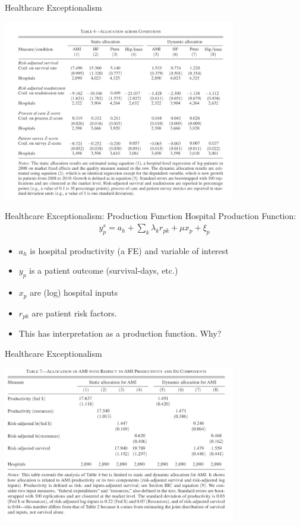 \documentclass[xcolor=pdftex,dvipsnames,table,mathserif,aspectratio=169]{beamer}
\begin{document}
\begin{frame}{Healthcare Exceptionalism}
\begin{center}
\includegraphics[width=4in]{./resources/hc4.png}
\end{center}
\end{frame}




\begin{frame}{Healthcare Exceptionalism: Production Function}
Hospital Production Function:
\begin{align*}
y_{p}^{s}=a_{h}+\sum_{k} \lambda_{k} r_{p k}+\mu x_{p}+\xi_{p}
\end{align*}
\begin{itemize}
\item $a_h$ is \alert{hospital productivity} (a FE) and variable of interest
\item $y_p$ is a patient outcome (survival-days, etc.)
\item $x_p$ are (log) hospital inputs
\item $r_{pk}$ are patient risk factors.
\item This has interpretation as a \alert{production function}. Why?
\end{itemize}
\end{frame}




\begin{frame}{Healthcare Exceptionalism}
\begin{center}
\includegraphics[width=4in]{./resources/hc7.png}
\end{center}
\end{frame}
\end{document}
